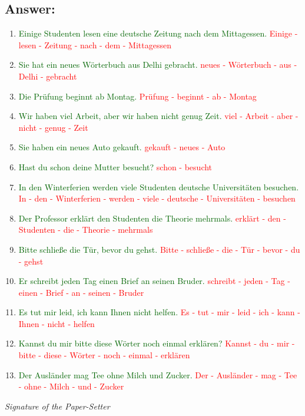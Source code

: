 \documentclass[12pt]{article}
\begin{document}
\subsection*{Answer:}
\begin{enumerate}
    \item \textcolor{darkgreen}{Einige Studenten lesen eine deutsche Zeitung nach dem Mittagessen.} \textcolor{red}{Einige - lesen - Zeitung - nach - dem - Mittagessen}
    \item \textcolor{darkgreen}{Sie hat ein neues Wörterbuch aus Delhi gebracht.} \textcolor{red}{neues - Wörterbuch - aus - Delhi - gebracht}
    \item \textcolor{darkgreen}{Die Prüfung beginnt ab Montag.} \textcolor{red}{Prüfung - beginnt - ab - Montag}
    \item \textcolor{darkgreen}{Wir haben viel Arbeit, aber wir haben nicht genug Zeit.} \textcolor{red}{viel - Arbeit - aber - nicht - genug - Zeit}
    \item \textcolor{darkgreen}{Sie haben ein neues Auto gekauft.} \textcolor{red}{gekauft - neues - Auto}
    \item \textcolor{darkgreen}{Hast du schon deine Mutter besucht?} \textcolor{red}{schon - besucht}
    \item \textcolor{darkgreen}{In den Winterferien werden viele Studenten deutsche Universitäten besuchen.} \textcolor{red}{In - den - Winterferien - werden - viele - deutsche - Universitäten - besuchen}
    \item \textcolor{darkgreen}{Der Professor erklärt den Studenten die Theorie mehrmals.} \textcolor{red}{erklärt - den - Studenten - die - Theorie - mehrmals}
    \item \textcolor{darkgreen}{Bitte schließe die Tür, bevor du gehst.} \textcolor{red}{Bitte - schließe - die - Tür - bevor - du - gehst}
    \item \textcolor{darkgreen}{Er schreibt jeden Tag einen Brief an seinen Bruder.} \textcolor{red}{schreibt - jeden - Tag - einen - Brief - an - seinen - Bruder}
    \item \textcolor{darkgreen}{Es tut mir leid, ich kann Ihnen nicht helfen.} \textcolor{red}{Es - tut - mir - leid - ich - kann - Ihnen - nicht - helfen}
    \item \textcolor{darkgreen}{Kannst du mir bitte diese Wörter noch einmal erklären?} \textcolor{red}{Kannst - du - mir - bitte - diese - Wörter - noch - einmal - erklären}
    \item \textcolor{darkgreen}{Der Ausländer mag Tee ohne Milch und Zucker.} \textcolor{red}{Der - Ausländer - mag - Tee - ohne - Milch - und - Zucker}
\end{enumerate}
\vspace{2em}

\noindent\textit{Signature of the Paper-Setter}
\end{document}
